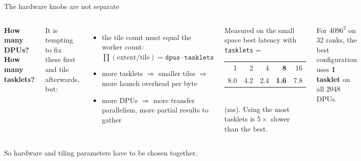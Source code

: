 \documentclass[aspectratio=169,11pt]{ccc-beamer}
\begin{document}
\begin{frame}{The hardware knobs are not separate}
  \begin{columns}[T]
    \textbf{How many DPUs? How many tasklets?}\par
    \medskip
    It is tempting to fix these first and tile afterwards, but:
    \begin{itemize}
      \item the tile count must equal the worker count: \\ $\prod (\text{extent}/\text{tile}) = \texttt{dpus}\cdot\texttt{tasklets}$
      \item more tasklets $\Rightarrow$ smaller tiles $\Rightarrow$ more launch overhead per byte
      \item more DPUs $\Rightarrow$ more transfer parallelism, more partial results to gather
    \end{itemize}
    \begin{alertblock}{Measured on the small space}
      best latency with \texttt{tasklets} = \\
      \begin{tabular}{@{}rrrrr@{}}
        1 & 2 & 4 & \textbf{8} & 16 \\
        8.0 & 4.2 & 2.4 & \textbf{1.6} & 7.8 \\
      \end{tabular}\\[.4em]
      \footnotesize (ms). Using the most tasklets is $5\times$ slower than the best.
    \end{alertblock}
    \medskip
    \small For $4096^2$ on 32 ranks, the best configuration uses \textbf{1 tasklet} on all 2048 DPUs.
  \end{columns}
  \bigskip
  \centering So hardware and tiling parameters have to be chosen together.
\end{frame}
\end{document}
